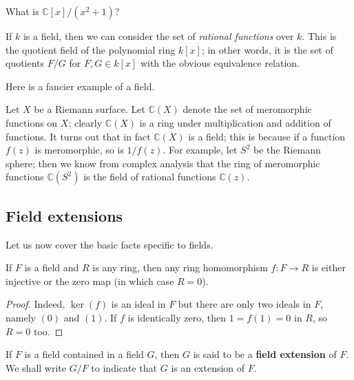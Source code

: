 \begin{exercise} 
What is $\mathbb{C}[x]/(x^2 + 1)$?
\end{exercise} 


\begin{example} \label{monofldext} 
If $k$ is a field, then we can consider the set of \emph{rational functions}
over $k$. This is the quotient field of the polynomial ring $k[x]$; in other
words, it is the set of quotients $F/G$ for $F, G \in k[x]$ with the obvious
equivalence relation.
\end{example} 


Here is a fancier example of a field.
\begin{example} 
\label{meromorphicfn}
Let $X$ be a Riemann surface. Let $\mathbb{C}(X)$ denote the
set of meromorphic functions on $X$; clearly $\mathbb{C}(X)$ is a ring under
multiplication and addition of functions. It turns out that in fact
$\mathbb{C}(X)$ is a
field; this is because if a function $f(z)$ is meromorphic, so is $1/f(z)$. For example,
let $S^2$ be the Riemann sphere; then we know from complex
analysis that the ring of meromorphic functions $\mathbb{C}(S^2)$ is the
field of rational functions $\mathbb{C}(z)$. 
\end{example}


\subsection{Field extensions}

Let us now cover the basic facts specific to fields.

\begin{proposition} \label{fieldinj} If $F$ is a field and $R$ is any ring, then any ring homomorphism $f:F\rightarrow
R$ is either injective or the zero map (in which case $R=0$).
\end{proposition}

\begin{proof} Indeed, $\ker(f)$ is an ideal in
$F$ but there are only two ideals in $F$, namely $(0)$ and $(1)$. If $f$ is identically
zero, then $1=f(1)=0$ in $R$, so $R=0$ too.
\end{proof}

\begin{definition} If $F$ is a field contained in a field $G$, then $G$ is said
to be a \textbf{field extension} of $F$. We shall write $G/F$ to indicate
that  $G$ is an extension of $F$.
\end{definition}

